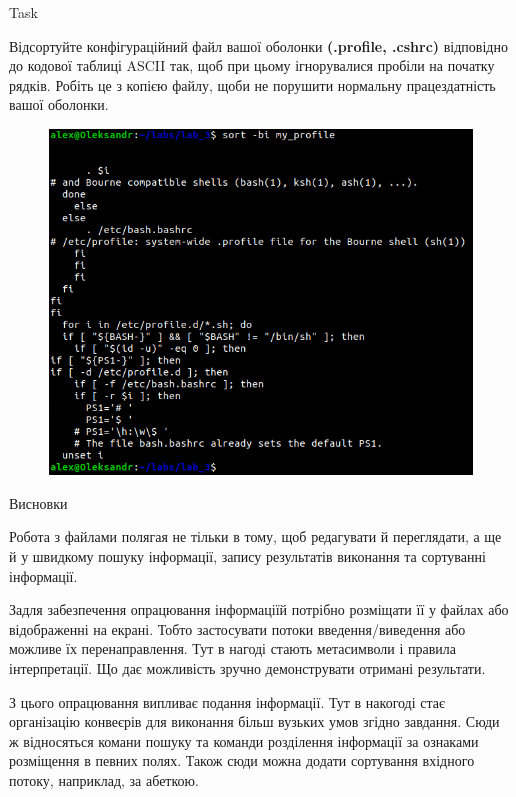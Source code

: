 \documentclass[a4paper,12pt]{article}
\newcommand{\RomanNumeralCaps}[1]{\MakeUppercase{\romannumeral #1}}
\begin{document}
    \begin{center}
        \Large{Task \RomanNumeralCaps{13}}
    \end{center}
    Відсортуйте конфігураційний файл вашої оболонки \textbf{(.profile, .cshrc)} відповідно до кодової таблиці ASCII так, щоб при цьому 
    ігнорувалися пробіли на початку рядків. Робіть це з копією файлу, щоби не порушити нормальну працездатність вашої оболонки.
    \begin{figure}[h!]
        \begin{minipage}[h]{1\linewidth}
            \centering
            \includegraphics[width=0.7\linewidth]{Prt sc/Figure_13.png}  
        \end{minipage}
    \end{figure}

\newpage
    \begin{center}
        \Large{Висновки}
    \end{center}

    Робота з файлами полягая не тільки в тому, щоб редагувати й переглядати, а ще й у швидкому пошуку інформації, запису 
    результатів виконання та сортуванні інформації.

    Задля забезпечення опрацювання інформаціїй потрібно розміщати її у файлах або відображенні на екрані. Тобто застосувати потоки
    введення/виведення або можливе їх перенаправлення. Тут в нагоді стають метасимволи і правила інтерпретації. Що дає можливість
    зручно демонструвати отримані результати.

    З цього опрацювання випливає подання інформації. Тут в накогоді стає організацію конвеєрів для виконання більш вузьких умов
    згідно завдання. Сюди ж відносяться комани пошуку та команди розділення інформації за ознаками розміщення в певних полях. 
    Також сюди можна додати сортування вхідного потоку, наприклад, за абеткою.
\end{document}
